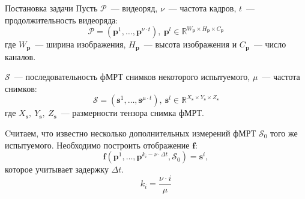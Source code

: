 \documentclass[9pt,pdf]{beamer} %
\begin{document}
\begin{frame}{Постановка задачи}
Пусть $\bm{\mathcal{P}}$~--- видеоряд, $\nu$~--- частота кадров, $t$~--- продолжительность видеоряда:
\begin{equation*}
    \bm{\mathcal{P}} = (\bm{p}^{1}, \dots, \bm{p}^{\nu \cdot t}),~\bm{p}^l \in \mathbb{R}^{W_{\bm{p}} \times H_{\bm{p}} \times C_{\bm{p}}}
\end{equation*}
где $W_{\bm{p}}$~---
ширина изображения, $H_{\bm{p}}$~--- высота изображения и $C_{\bm{p}}$~--- число каналов.

$\mathcal{S}$~--- последовательность фМРТ снимков некоторого испытуемого,  $\mu$~--- частота снимков:
\begin{equation*}
    \mathcal{S} = (\bm{s}^{1}, \dots, \bm{s}^{\mu \cdot t}),~\bm{s}^l \in \mathbb{R}^{X_{\bm{s}} \times Y_{\bm{s}} \times Z_{\bm{s}}}
\end{equation*}
где $X_{\bm{s}},~Y_{\bm{s}},~Z_{\bm{s}}$~--- размерности тензора снимка фМРТ.

Cчитаем, что известно несколько дополнительных измерений фМРТ $\mathcal{S}_0$ того же испытуемого.
Необходимо построить отображение $\bm{f}$:
\begin{equation*}
    \bm{f}(\bm{p}^{1}, \dots, \bm{p}^{k_i - \nu \cdot \Delta t}, \mathcal{S}_0) = \bm{s}^i,
\end{equation*}
которое учитывает задержку $\Delta t$.
\begin{equation*}
    \label{k_i}
    k_i = \dfrac{\nu \cdot i}{\mu}
\end{equation*}
\end{frame}
\end{document}
